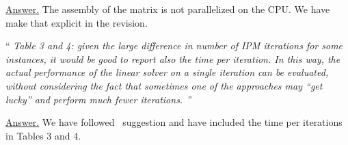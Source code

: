 \documentclass[10pt,a4paper]{article}
\newenvironment{quotereviewer}{\vspace{.5cm}{\underline\reviewername} ``\it\footnotesize}{''}
\newcommand{\answer}{\vspace{1mm}\underline{Answer.} }
\begin{document}
\answer
The assembly of the matrix is not parallelized on the CPU. We have make that explicit in the revision.

\begin{quotereviewer}
Table 3 and 4: given the large difference in number of IPM iterations for some instances, it would be good to report also the time per iteration. In this way, the actual performance of the linear solver on a single iteration can be evaluated, without considering the fact that sometimes one of the approaches may ``get lucky'' and perform much fewer iterations.
\end{quotereviewer}

\answer
We have followed \reviewername\ suggestion and have included the time per iterations in Tables 3 and 4.




\end{document}
